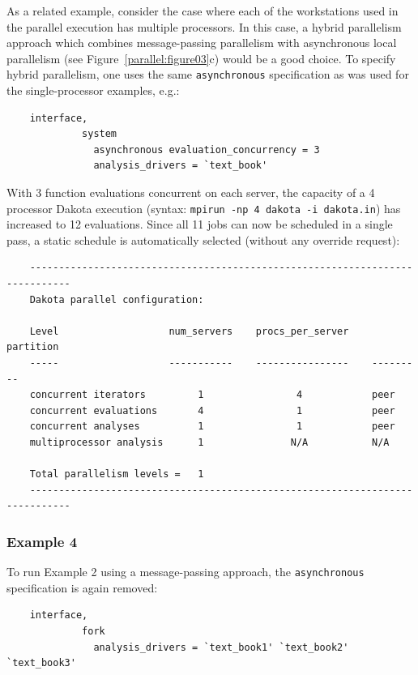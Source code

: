 As a related example, consider the case where each of the workstations
used in the parallel execution has multiple processors. In this case,
a hybrid parallelism approach which combines message-passing
parallelism with asynchronous local parallelism (see
Figure~\ref{parallel:figure03}c) would be a good choice. To specify
hybrid parallelism, one uses the same \texttt{asynchronous}
specification as was used for the single-processor examples, e.g.:
\begin{small}
\begin{verbatim}
    interface,
             system
               asynchronous evaluation_concurrency = 3
               analysis_drivers = `text_book'
\end{verbatim}
\end{small}

With 3 function evaluations concurrent on each server, the capacity of
a 4 processor Dakota execution (syntax: \texttt{mpirun -np 4 dakota -i
  dakota.in}) has increased to 12 evaluations. Since all 11 jobs can
now be scheduled in a single pass, a static schedule is automatically
selected (without any override request):
\begin{small}
\begin{verbatim}
    -----------------------------------------------------------------------------
    Dakota parallel configuration:

    Level                   num_servers    procs_per_server    partition
    -----                   -----------    ----------------    ---------
    concurrent iterators         1                4            peer
    concurrent evaluations       4                1            peer
    concurrent analyses          1                1            peer
    multiprocessor analysis      1               N/A           N/A

    Total parallelism levels =   1
    -----------------------------------------------------------------------------
\end{verbatim}
\end{small}

\subsubsection{Example 4}\label{parallel:spec:multi:example4}

To run Example 2 using a message-passing approach, the
\texttt{asynchronous} specification is again removed:
\begin{small}
\begin{verbatim}
    interface,
             fork
               analysis_drivers = `text_book1' `text_book2' `text_book3'
\end{verbatim}
\end{small}

